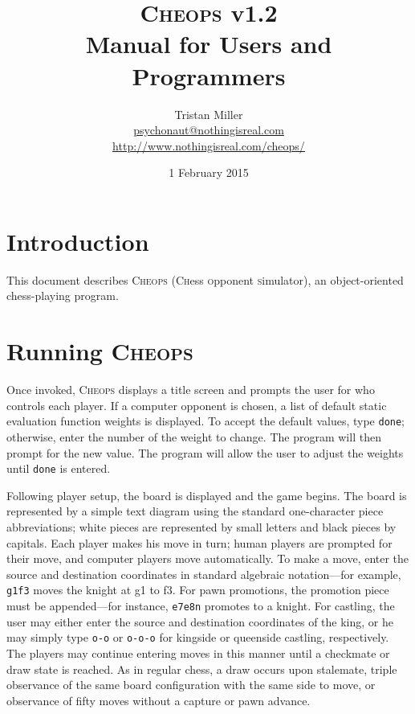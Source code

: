 \documentclass[a4paper]{article}
\begin{document}
\title{\textsc{Cheops} v1.2\\Manual for Users and Programmers}
\author{Tristan Miller\\ \url{psychonaut@nothingisreal.com}\\ 
  \url{http://www.nothingisreal.com/cheops/}}
\date{1 February 2015}
\maketitle

\section{Introduction}

This document describes \textsc{Cheops} (\textsc{Ch}ess
\textsc{o}pponent \textsc{s}imulator), an object-oriented
chess-playing program.

\section{Running \textsc{Cheops}}

Once invoked, \textsc{Cheops} displays a title screen and prompts the
user for who controls each player. If a computer opponent is chosen, a
list of default static evaluation function weights is displayed.  To
accept the default values, type \texttt{done}; otherwise, enter the
number of the weight to change. The program will then prompt for the
new value.  The program will allow the user to adjust the weights
until \texttt{done} is entered.

Following player setup, the board is displayed and the game begins.
The board is represented by a simple text diagram using the standard
one-character piece abbreviations; white pieces are represented by
small letters and black pieces by capitals.  Each player makes his
move in turn; human players are prompted for their move, and computer
players move automatically. To make a move, enter the source and
destination coordinates in standard algebraic notation---for example,
\texttt{g1f3} moves the knight at g1 to f3.  For pawn promotions, the
promotion piece must be appended---for instance, \texttt{e7e8n}
promotes to a knight. For castling, the user may either enter the
source and destination coordinates of the king, or he may simply type
\texttt{o-o} or \texttt{o-o-o} for kingside or queenside castling,
respectively. The players may continue entering moves in this manner
until a checkmate or draw state is reached. As in regular chess, a
draw occurs upon stalemate, triple observance of the same board
configuration with the same side to move, or observance of fifty moves
without a capture or pawn advance.
\end{document}
